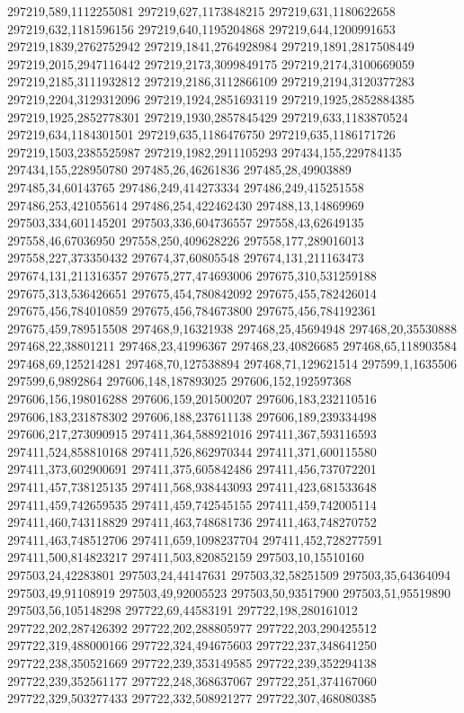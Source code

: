 297219,589,1112255081
297219,627,1173848215
297219,631,1180622658
297219,632,1181596156
297219,640,1195204868
297219,644,1200991653
297219,1839,2762752942
297219,1841,2764928984
297219,1891,2817508449
297219,2015,2947116442
297219,2173,3099849175
297219,2174,3100669059
297219,2185,3111932812
297219,2186,3112866109
297219,2194,3120377283
297219,2204,3129312096
297219,1924,2851693119
297219,1925,2852884385
297219,1925,2852778301
297219,1930,2857845429
297219,633,1183870524
297219,634,1184301501
297219,635,1186476750
297219,635,1186171726
297219,1503,2385525987
297219,1982,2911105293
297434,155,229784135
297434,155,228950780
297485,26,46261836
297485,28,49903889
297485,34,60143765
297486,249,414273334
297486,249,415251558
297486,253,421055614
297486,254,422462430
297488,13,14869969
297503,334,601145201
297503,336,604736557
297558,43,62649135
297558,46,67036950
297558,250,409628226
297558,177,289016013
297558,227,373350432
297674,37,60805548
297674,131,211163473
297674,131,211316357
297675,277,474693006
297675,310,531259188
297675,313,536426651
297675,454,780842092
297675,455,782426014
297675,456,784010859
297675,456,784673800
297675,456,784192361
297675,459,789515508
297468,9,16321938
297468,25,45694948
297468,20,35530888
297468,22,38801211
297468,23,41996367
297468,23,40826685
297468,65,118903584
297468,69,125214281
297468,70,127538894
297468,71,129621514
297599,1,1635506
297599,6,9892864
297606,148,187893025
297606,152,192597368
297606,156,198016288
297606,159,201500207
297606,183,232110516
297606,183,231878302
297606,188,237611138
297606,189,239334498
297606,217,273090915
297411,364,588921016
297411,367,593116593
297411,524,858810168
297411,526,862970344
297411,371,600115580
297411,373,602900691
297411,375,605842486
297411,456,737072201
297411,457,738125135
297411,568,938443093
297411,423,681533648
297411,459,742659535
297411,459,742545155
297411,459,742005114
297411,460,743118829
297411,463,748681736
297411,463,748270752
297411,463,748512706
297411,659,1098237704
297411,452,728277591
297411,500,814823217
297411,503,820852159
297503,10,15510160
297503,24,42283801
297503,24,44147631
297503,32,58251509
297503,35,64364094
297503,49,91108919
297503,49,92005523
297503,50,93517900
297503,51,95519890
297503,56,105148298
297722,69,44583191
297722,198,280161012
297722,202,287426392
297722,202,288805977
297722,203,290425512
297722,319,488000166
297722,324,494675603
297722,237,348641250
297722,238,350521669
297722,239,353149585
297722,239,352294138
297722,239,352561177
297722,248,368637067
297722,251,374167060
297722,329,503277433
297722,332,508921277
297722,307,468080385
